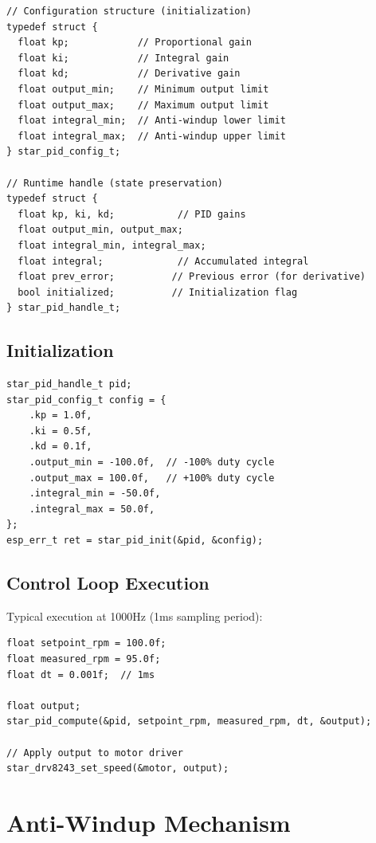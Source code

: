 \documentclass[11pt,a4paper]{article}
\begin{document}
\begin{lstlisting}
// Configuration structure (initialization)
typedef struct {
  float kp;            // Proportional gain
  float ki;            // Integral gain
  float kd;            // Derivative gain
  float output_min;    // Minimum output limit
  float output_max;    // Maximum output limit
  float integral_min;  // Anti-windup lower limit
  float integral_max;  // Anti-windup upper limit
} star_pid_config_t;

// Runtime handle (state preservation)
typedef struct {
  float kp, ki, kd;           // PID gains
  float output_min, output_max;
  float integral_min, integral_max;
  float integral;             // Accumulated integral
  float prev_error;          // Previous error (for derivative)
  bool initialized;          // Initialization flag
} star_pid_handle_t;
\end{lstlisting}

\subsection{Initialization}

\begin{lstlisting}
star_pid_handle_t pid;
star_pid_config_t config = {
    .kp = 1.0f,
    .ki = 0.5f,
    .kd = 0.1f,
    .output_min = -100.0f,  // -100% duty cycle
    .output_max = 100.0f,   // +100% duty cycle
    .integral_min = -50.0f,
    .integral_max = 50.0f,
};
esp_err_t ret = star_pid_init(&pid, &config);
\end{lstlisting}

\subsection{Control Loop Execution}

Typical execution at 1000Hz (1ms sampling period):

\begin{lstlisting}
float setpoint_rpm = 100.0f;
float measured_rpm = 95.0f;
float dt = 0.001f;  // 1ms

float output;
star_pid_compute(&pid, setpoint_rpm, measured_rpm, dt, &output);

// Apply output to motor driver
star_drv8243_set_speed(&motor, output);
\end{lstlisting}

\section{Anti-Windup Mechanism}
\end{document}
